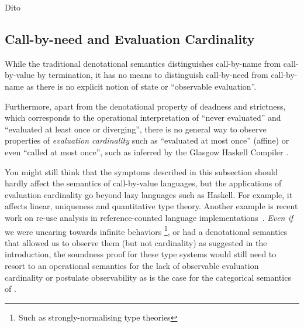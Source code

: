 Dito

\subsection{Call-by-need and Evaluation Cardinality}

While the traditional denotational semantics distinguishes call-by-name from
call-by-value by termination, it has no means to distinguish call-by-need from
call-by-name as there is no explicit notion of state or ``observable evaluation''.

Furthermore, apart from the denotational property of deadness and strictness,
which corresponds to the operational interpretation of ``never evaluated'' and
``evaluated at least once or diverging'', there is no general way to observe
properties of \emph{evaluation cardinality} such as ``evaluated at most once''
(affine) or even ``called at most once'', such as inferred by the Glasgow
Haskell Compiler \cite{cardinality}.

You might still think that the symptoms described in this subsection should
hardly affect the semantics of call-by-value languages, but the applications
of evaluation cardinality go beyond lazy languages such as Haskell.
For example, it affects linear, uniqueness and quantitative type
theory.
Another example is recent work on re-use analysis in reference-counted language
implementations~\cite{Ullrich:19,perceus}.
\emph{Even if} we were uncaring towards infinite behaviors%
\footnote{Such as strongly-normalising type theories},
or had a denotational semantics that allowed us to observe them (but not
cardinality) as suggested in the introduction, the soundness proof for these
type systems would still need to resort to an operational semantics for the lack
of observable evaluation cardinality or postulate observability as is the case
for the categorical semantics of \citep{Atkey:18}.

